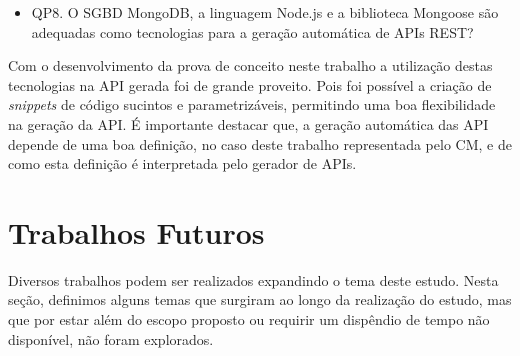 \begin{itemize}
	\item QP8. O SGBD MongoDB, a linguagem Node.js e a biblioteca Mongoose são adequadas como tecnologias para a geração automática de APIs REST?
\end{itemize}

Com o desenvolvimento da prova de conceito neste trabalho a utilização destas tecnologias na API gerada foi de grande proveito. Pois foi possível a criação de \textit{snippets} de código sucintos e parametrizáveis, permitindo uma boa flexibilidade na geração da API. É importante destacar que, a geração automática das API depende de uma boa definição, no caso deste trabalho representada pelo CM, e de como esta definição é interpretada pelo gerador de APIs.


\section{Trabalhos Futuros}

Diversos trabalhos podem ser realizados expandindo o tema deste estudo. Nesta seção, definimos alguns temas que surgiram ao longo da realização do estudo, mas que por estar além do escopo proposto ou requirir um dispêndio de tempo não disponível, não foram explorados.

